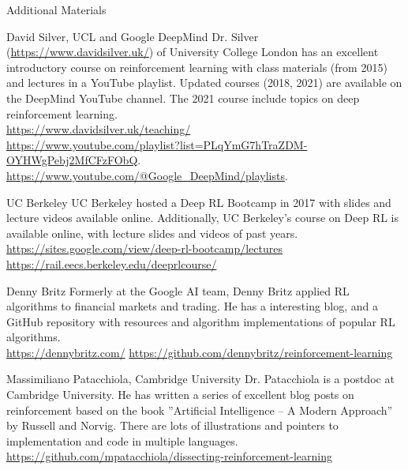 \documentclass[ignorenonframetext,xcolor=x11names]{beamer}
\begin{document}
\begin{frame}[allowframebreaks]{Additional Materials}
\footnotesize
\begin{block}{David Silver, UCL and Google DeepMind}
Dr. Silver (\url{https://www.davidsilver.uk/}) of University College London has an excellent introductory course on reinforcement learning with class materials (from 2015) and lectures in a YouTube playlist. Updated courses (2018, 2021) are available on the DeepMind YouTube channel. The 2021 course include topics on deep reinforcement learning. \\
\vspace{\baselineskip}
\url{https://www.davidsilver.uk/teaching/} \\
\vspace{.5\baselineskip}
\url{https://www.youtube.com/playlist?list=PLqYmG7hTraZDM-OYHWgPebj2MfCFzFObQ}. \\
\vspace{.5\baselineskip}
\url{https://www.youtube.com/@Google_DeepMind/playlists}.
\end{block}

\begin{block}{UC Berkeley}
UC Berkeley hosted a Deep RL Bootcamp in 2017 with slides and lecture videos available online. Additionally, UC Berkeley's course on Deep RL is available online, with lecture slides and videos of past years.
\vspace{\baselineskip}
\url{https://sites.google.com/view/deep-rl-bootcamp/lectures}
\vspace{\baselineskip}
\url{https://rail.eecs.berkeley.edu/deeprlcourse/}
\end{block}

\begin{block}{Denny Britz}
Formerly at the Google AI team, Denny Britz applied RL algorithms to financial markets and trading. He has a interesting blog, and a GitHub repository with resources and algorithm implementations of popular RL algorithms. \\
\vspace{\baselineskip}
\url{https://dennybritz.com/}
\vspace{\baselineskip}
\url{https://github.com/dennybritz/reinforcement-learning}
\end{block}

\begin{block}{Massimiliano Patacchiola, Cambridge University} 
Dr. Patacchiola is a postdoc at Cambridge University. He has written a series of excellent blog posts on reinforcement based on the book ''Artificial Intelligence -- A Modern Approach'' by Russell and Norvig. There are lots of illustrations and pointers to implementation and code in multiple languages. \\
\vspace{\baselineskip}
\url{https://github.com/mpatacchiola/dissecting-reinforcement-learning}
\end{block}


\end{frame}
\end{document}
